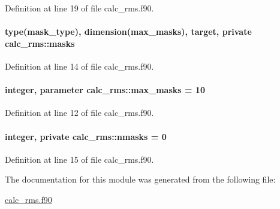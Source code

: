 Definition at line 19 of file calc\-\_\-rms.\-f90.

\hypertarget{classcalc__rms_aa6d25b1a7e8948fc7a1357c00d76b99d}{
\paragraph[{masks}]{\setlength{\rightskip}{0pt plus 5cm}type(mask\-\_\-type), dimension({\bf max\-\_\-masks}), target, private calc\-\_\-rms\-::masks\hspace{0.3cm}{\ttfamily [private]}}}\label{classcalc__rms_aa6d25b1a7e8948fc7a1357c00d76b99d}


Definition at line 14 of file calc\-\_\-rms.\-f90.

\hypertarget{classcalc__rms_ae2b830ba7835ceafcb4e529ffdaeaa80}{
\paragraph[{max\-\_\-masks}]{\setlength{\rightskip}{0pt plus 5cm}integer, parameter calc\-\_\-rms\-::max\-\_\-masks = 10}}\label{classcalc__rms_ae2b830ba7835ceafcb4e529ffdaeaa80}


Definition at line 12 of file calc\-\_\-rms.\-f90.

\hypertarget{classcalc__rms_a2b9f0f62087252c30ade1e18cf31df42}{
\paragraph[{nmasks}]{\setlength{\rightskip}{0pt plus 5cm}integer, private calc\-\_\-rms\-::nmasks = 0\hspace{0.3cm}{\ttfamily [private]}}}\label{classcalc__rms_a2b9f0f62087252c30ade1e18cf31df42}


Definition at line 15 of file calc\-\_\-rms.\-f90.



The documentation for this module was generated from the following file\-:\begin{DoxyCompactItemize}
\item 
\hyperlink{calc__rms_8f90}{calc\-\_\-rms.\-f90}\end{DoxyCompactItemize}
